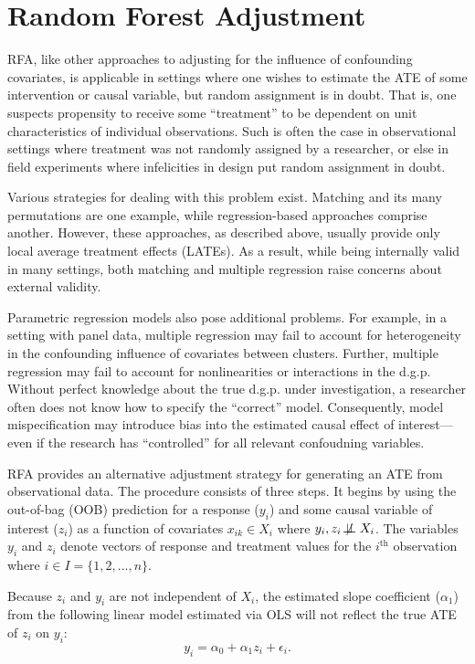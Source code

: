 \documentclass[11pt,]{article}
\begin{document}
\hypertarget{random-forest-adjustment}{%
\section{Random Forest Adjustment}\label{random-forest-adjustment}}

RFA, like other approaches to adjusting for the influence of confounding
covariates, is applicable in settings where one wishes to estimate the
ATE of some intervention or causal variable, but random assignment is in
doubt. That is, one suspects propensity to receive some ``treatment'' to
be dependent on unit characteristics of individual observations. Such is
often the case in observational settings where treatment was not
randomly assigned by a researcher, or else in field experiments where
infelicities in design put random assignment in doubt.

Various strategies for dealing with this problem exist. Matching and its
many permutations are one example, while regression-based approaches
comprise another. However, these approaches, as described above, usually
provide only local average treatment effects (LATEs). As a result, while
being internally valid in many settings, both matching and multiple
regression raise concerns about external validity.

Parametric regression models also pose additional problems. For example,
in a setting with panel data, multiple regression may fail to account
for heterogeneity in the confounding influence of covariates between
clusters. Further, multiple regression may fail to account for
nonlinearities or interactions in the d.g.p. Without perfect knowledge
about the true d.g.p. under investigation, a researcher often does not
know how to specify the ``correct'' model. Consequently, model
mispecification may introduce bias into the estimated causal effect of
interest---even if the research has ``controlled'' for all relevant
confoudning variables.

RFA provides an alternative adjustment strategy for generating an ATE
from observational data. The procedure consists of three steps. It
begins by using the out-of-bag (OOB) prediction for a response (\(y_i\))
and some causal variable of interest (\(z_i\)) as a function of
covariates \(x_{ik} \in X_i\) where
\(y_i,z_i \not\!\perp\!\!\!\perp X_i\). The variables \(y_i\) and
\(z_i\) denote vectors of response and treatment values for the
\(i^\text{th}\) observation where \(i \in I = \{1,2,...,n \}\).

Because \(z_i\) and \(y_i\) are not independent of \(X_i\), the
estimated slope coefficient (\(\alpha_1\)) from the following linear
model estimated via OLS will not reflect the true ATE of \(z_i\) on
\(y_i\): \[y_i = \alpha_0 + \alpha_1z_i + \epsilon_i. \tag{1}\]
\end{document}
